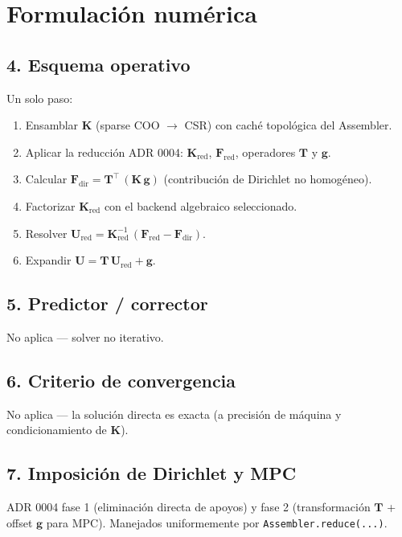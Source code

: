 \documentclass[11pt,letterpaper,oneside]{report}
\begin{document}
\section{Formulación numérica}

\subsection{4. Esquema operativo}

Un solo paso:

\begin{enumerate}
  \item Ensamblar $\mathbf K$ (sparse COO \ensuremath{\to} CSR) con caché topológica del Assembler.
  \item Aplicar la reducción ADR 0004: $\mathbf K_{\text{red}}$, $\mathbf F_{\text{red}}$, operadores $\mathbf T$ y $\mathbf g$.
  \item Calcular $\mathbf F_{\text{dir}} = \mathbf T^\top\,(\mathbf K\,\mathbf g)$ (contribución de Dirichlet no homogéneo).
  \item Factorizar $\mathbf K_{\text{red}}$ con el backend algebraico seleccionado.
  \item Resolver $\mathbf U_{\text{red}} = \mathbf K_{\text{red}}^{-1}\,(\mathbf F_{\text{red}} - \mathbf F_{\text{dir}})$.
  \item Expandir $\mathbf U = \mathbf T\,\mathbf U_{\text{red}} + \mathbf g$.
\end{enumerate}

\subsection{5. Predictor / corrector}

No aplica --- solver no iterativo.

\subsection{6. Criterio de convergencia}

No aplica --- la solución directa es exacta (a precisión de máquina y condicionamiento de $\mathbf K$).

\subsection{7. Imposición de Dirichlet y MPC}

ADR 0004 fase 1 (eliminación directa de apoyos) y fase 2 (transformación $\mathbf T$ + offset $\mathbf g$ para MPC). Manejados uniformemente por \texttt{Assembler.reduce(...)}.
\end{document}
